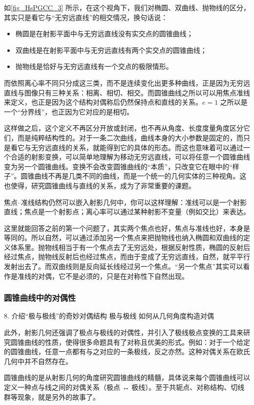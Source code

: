 如\autoref{fig_HsPGCC_3} 所示，在这个视角下，我们对椭圆、双曲线、抛物线的区分，其实只是看它与“无穷远直线”的相交情况，换句话说：
\begin{itemize}
\item 椭圆是在射影平面中与无穷远直线没有实交点的圆锥曲线；
\item 双曲线是在射影平面中与无穷远直线有两个实交点的圆锥曲线；
\item 抛物线是恰好与无穷远直线有一个交点的极限情形。
\end{itemize}

而依照离心率不同只分成这三类，而不是连续变化出更多种曲线，正是因为无穷远直线与图像只有三种关系：相离、相切、相交。而圆锥曲线之所以可以用焦点准线来定义，也正是因为这个结构对偶称后仍然保持点和直线的关系。$e=1$ 之所以是一个“分界线”，也正因为它对应的是相切。

这样做之后，这个定义不再区分开放或封闭，也不再从角度、长度度量角度区分它们，而是纯粹结构性的。对于一条二次曲线，曲线本身的大小参数是固定的，而只是看它与无穷远直线的关系，就能得到它的具体的形态。而这也意味着可以通过一个合适的射影变换，可以简单地理解为移动无穷远直线，可以将任意一个圆锥曲线变为另一个圆锥曲线。变换不会改变圆锥曲线的“本质”，只改变它在眼中的“样子”。圆锥曲线不再是几类不同的曲线，而是一个统一的几何实体的三种视角。这也使得，研究圆锥曲线与直线的关系，成为了非常重要的课题。

焦点–准线结构仍然可以嵌入射影几何中，你可以这样理解：准线可以是一个射影直线；焦点是一个射影点；离心率可以通过某种射影不变量（例如交比）来表达。

这里就能回答之前的第一个问题了，其实两个焦点也好，焦点与准线也好，本身是等同的。所以自然，可以通过添加另一个焦点来把抛物线也纳入椭圆和双曲线的定义体系里。抛物线相当于有一个焦点去了无穷远处，根据反射性质，椭圆的反射后经过焦点，抛物线反射后也经过焦点，而由于变成了无穷远直线，自然，就平平行发射出去了。而双曲线则是反向延长线经过另一个焦点。“另一个焦点”其实可以看作是准线的对偶，它不是必须的，只是在对称性下自然出现。

\subsubsection{圆锥曲线中的对偶性}


	8.	介绍“极与极线”的奇妙对偶结构
极与极线	如何从几何角度构造对偶

此外，射影几何还强调了极点与极线的对偶性，并引入了极线极点变换的工具来研究圆锥曲线的性质，使得很多命题具有了对称且优美的形式。例如：对于一个给定的圆锥曲线，任意一点都有与之对应的一条极线，反之亦然。这种对偶关系在欧氏几何中并不自然存在。

圆锥曲线的是从射影几何的角度研究圆锥曲线的精髓，具体说来每个圆锥曲线可以定义一种点与线之间的对偶关系（极点 ↔ 极线）。至于共轭点、对称结构、切线群等现象，就是另外的故事了。


